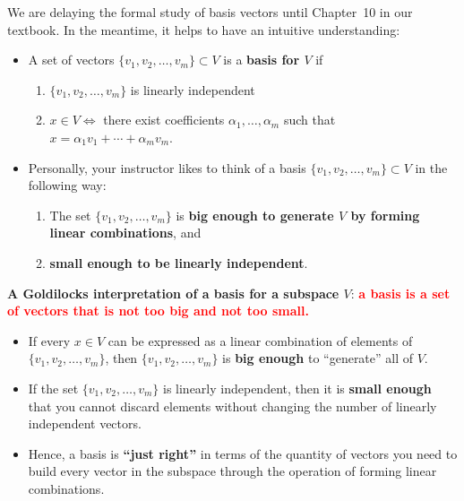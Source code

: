 \begin{tcolorbox}[title=\textbf{Preview of Basis Vectors}] We are delaying the formal study of basis vectors until Chapter~10 in our textbook. In the meantime, it helps to have an intuitive understanding:
\begin{itemize}
    \item A set of vectors $\{ v_1, v_2,  \ldots, v_m\} \subset V$ is a \textbf{basis for $V$} if
    \begin{enumerate}
    \renewcommand{\labelenumi}{(\alph{enumi})}
\setlength{\itemsep}{.2cm}
        \item $\{ v_1, v_2,  \ldots, v_m\}$ is linearly independent
        \item $x\in V \iff$ there exist coefficients $\alpha_1, \ldots, \alpha_m$ such that $x = \alpha_1 v_1  + \cdots + \alpha_m v_m$.
    \end{enumerate}
\item Personally, your instructor likes to think of a basis $\{ v_1, v_2,  \ldots, v_m\} \subset V$ in the following way:
\begin{enumerate}
    \renewcommand{\labelenumi}{(\alph{enumi})}
\setlength{\itemsep}{.2cm}
    \item  The set $\{ v_1, v_2,  \ldots, v_m\}$  is \textbf{big enough to generate $V$ by forming linear combinations}, and
    \item \textbf{small enough to be linearly independent}.
    \end{enumerate}
\end{itemize}
 
\end{tcolorbox}

\vspace*{.2cm}

\textbf{A Goldilocks interpretation of a basis for a subspace $V$}: \textcolor{red}{\bf a basis is a set of vectors that is not too big and not too small.} 
\begin{itemize}

    \item If every $x \in V$ can be expressed as a linear combination of elements of $\{ v_1, v_2,  \ldots, v_m\}$, then  $\{ v_1, v_2,  \ldots, v_m\}$ is \textbf{big enough} to ``generate'' all of $V$. 
        \item If the set  $\{ v_1, v_2,  \ldots, v_m\}$ is linearly independent, then it is \textbf{small enough} that you cannot discard elements without changing the number of linearly independent vectors.
        \item Hence, a basis is \textbf{``just right''} in terms of the quantity of vectors you need to build every vector in the subspace through the operation of forming linear combinations.
\end{itemize}

